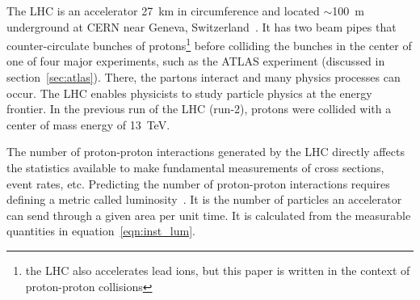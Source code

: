 The LHC is an accelerator \SI{27}{\kilo\meter} in circumference and located $\sim$\SI{100}{\meter} underground at CERN near Geneva, Switzerland~\cite{evans_lhc_2008}. It has two beam pipes that counter-circulate bunches of protons\footnote{the LHC also accelerates lead ions, but this paper is written in the context of proton-proton collisions} before colliding the bunches in the center of one of four major experiments, such as the ATLAS experiment (discussed in section~\ref{sec:atlas}). There, the partons interact and many physics processes can occur. The LHC enables physicists to study particle physics at the energy frontier. In the previous run of the LHC (run-2), protons were collided with a center of mass energy of \SI{13}{\tera\electronvolt}. 


The number of proton-proton interactions generated by the LHC directly affects the statistics available to make fundamental measurements of cross sections, event rates, etc. 
Predicting the number of proton-proton interactions requires defining a metric called luminosity~\cite{zyla_review_2020}. It is the number of particles an accelerator can send through a given area per unit time. It is calculated from the measurable quantities in equation~\ref{eqn:inst_lum}.

